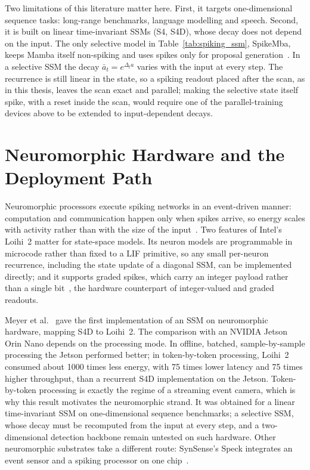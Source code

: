 \documentclass[11pt, a4paper]{report}
\begin{document}
Two limitations of this literature matter here. First, it targets one-dimensional sequence tasks: long-range
benchmarks, language modelling and speech. Second, it is built on linear time-invariant SSMs (S4, S4D), whose
decay does not depend on the input. The only selective model in Table~\ref{tab:spiking_ssm}, SpikeMba, keeps
Mamba itself non-spiking and uses spikes only for proposal generation~\cite{li2024spikemba}. In a selective
SSM the decay $\bar a_t = e^{\Delta_t a}$ varies with the input at every step. The recurrence is still linear
in the state, so a spiking readout placed after the scan, as in this thesis, leaves the scan exact and
parallel; making the selective state itself spike, with a reset inside the scan, would require one of the
parallel-training devices above to be extended to input-dependent decays.

\section{Neuromorphic Hardware and the Deployment Path}
\label{sec:neuromorphic_hw}
Neuromorphic processors execute spiking networks in an event-driven manner: computation and
communication happen only when spikes arrive, so energy scales with activity rather than with the size of
the input~\cite{davies2021advancing}. Two features of Intel's Loihi~2 matter for state-space models.
Its neuron models are programmable in microcode rather than fixed to a LIF primitive, so any small
per-neuron recurrence, including the state update of a diagonal SSM, can be implemented directly; and it
supports graded spikes, which carry an integer payload rather than a single bit~\cite{orchard2021efficient},
the hardware counterpart of integer-valued and graded readouts.

Meyer et al.~\cite{meyer2024diagonal} gave the first implementation of an SSM on neuromorphic hardware,
mapping S4D to Loihi~2. The comparison with an NVIDIA Jetson Orin Nano depends on the processing mode. In
offline, batched, sample-by-sample processing the Jetson performed better; in token-by-token processing,
Loihi~2 consumed about 1000 times less energy, with 75 times lower latency and 75 times higher throughput,
than a recurrent S4D implementation on the Jetson. Token-by-token processing is exactly the regime of a
streaming event camera, which is why this result motivates the neuromorphic strand. It was obtained for a
linear time-invariant SSM on one-dimensional sequence benchmarks; a selective SSM, whose decay must be
recomputed from the input at every step, and a two-dimensional detection backbone remain untested on such
hardware. Other neuromorphic substrates take a different route: SynSense's Speck integrates an event sensor
and a spiking processor on one chip~\cite{synsense2026speck}.
\end{document}
